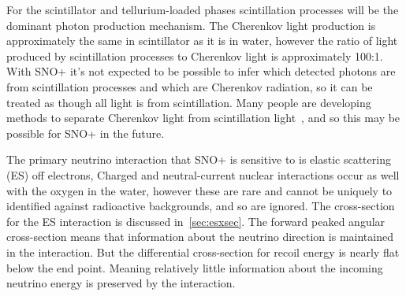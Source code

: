 For the scintillator and tellurium-loaded phases scintillation processes will be
the dominant photon production mechanism.
The Cherenkov light production is approximately the same in scintillator as it is in
water, however the ratio of light produced by scintillation processes to Cherenkov
light is approximately 100:1.
With SNO+ it's not expected to be possible to infer which detected photons are
from scintillation processes and which are Cherenkov radiation, so it can be treated
as though all light is from scintillation.
Many people are developing methods to separate Cherenkov light from scintillation
light~\citep{tanners_paper,javi_chess, winslow_directionality},
and so this may be possible for SNO+ in the future.

The primary neutrino interaction that SNO+ is sensitive to is elastic scattering (ES)
off electrons,
Charged and neutral-current nuclear interactions occur as well with the oxygen in the water,
however these are rare and cannot be uniquely to identified against radioactive
backgrounds, and so are ignored.
The cross-section for the ES interaction is discussed in~\ref{sec:esxsec}.
The forward peaked angular cross-section means that information about the
neutrino direction is maintained in the interaction.
But the differential cross-section for recoil energy is nearly flat below the
end point. Meaning relatively little information about the incoming neutrino energy
is preserved by the interaction.






